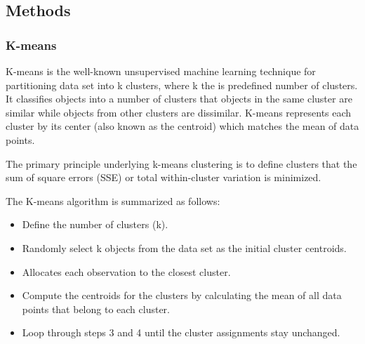 \documentclass[a4paper, 12pt]{article}
\begin{document}
\subsection{Methods}


\subsubsection{K-means}

K-means is the well-known unsupervised machine learning technique for partitioning data set into k clusters, where k the is predefined number of clusters. It classifies objects into a number of clusters that objects in the same cluster are similar while objects from other clusters are dissimilar. K-means represents each cluster by its center (also known as the centroid) which matches the mean of data points.

The primary principle underlying k-means clustering is to define clusters that the sum of square errors (SSE) or total within-cluster variation is minimized. 

The K-means algorithm is summarized as follows:

\begin{itemize}
    \item Define the number of clusters (k).
    \item Randomly select k objects from the data set as the initial cluster centroids.
    \item Allocates each observation to the closest cluster.
    \item Compute the centroids for the clusters by calculating the mean of all data points that belong to each cluster.
    \item Loop through steps 3 and 4 until the cluster assignments stay unchanged.
\end{itemize}
\end{document}
